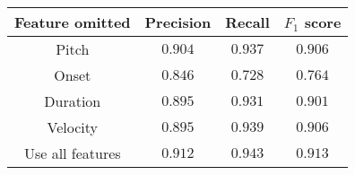 \begin{tabular}{cccc}
    \textbf{Feature omitted} & \textbf{Precision} & \textbf{Recall} & \textbf{$F_1$ score} \\\hline
    Pitch                    & $0.904$            & $0.937$         & $0.906$              \\
    Onset                    & $0.846$            & $0.728$         & $0.764$              \\
    Duration                 & $0.895$            & $0.931$         & $0.901$              \\
    Velocity                 & $0.895$            & $0.939$         & $0.906$              \\
    Use all features         & $0.912$            & $0.943$         & $\mathbf{0.913}$     \\
\end{tabular}
